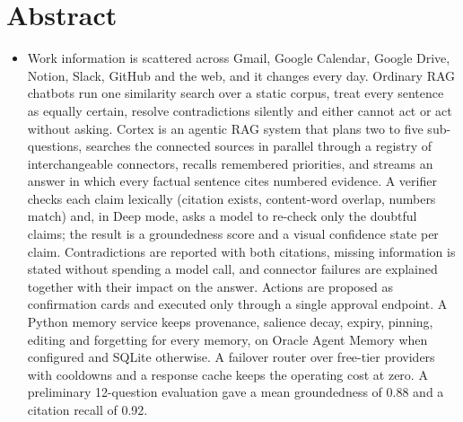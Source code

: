 \documentclass[oneside,a4paper,12pt]{report}
\begin{document}
\section{Abstract}
\begin{itemize}
	\item Work information is scattered across Gmail, Google Calendar, Google Drive, Notion, Slack, GitHub and the web, and it changes every day. Ordinary RAG chatbots run one similarity search over a static corpus, treat every sentence as equally certain, resolve contradictions silently and either cannot act or act without asking. Cortex is an agentic RAG system that plans two to five sub-questions, searches the connected sources in parallel through a registry of interchangeable connectors, recalls remembered priorities, and streams an answer in which every factual sentence cites numbered evidence. A verifier checks each claim lexically (citation exists, content-word overlap, numbers match) and, in Deep mode, asks a model to re-check only the doubtful claims; the result is a groundedness score and a visual confidence state per claim. Contradictions are reported with both citations, missing information is stated without spending a model call, and connector failures are explained together with their impact on the answer. Actions are proposed as confirmation cards and executed only through a single approval endpoint. A Python memory service keeps provenance, salience decay, expiry, pinning, editing and forgetting for every memory, on Oracle Agent Memory when configured and SQLite otherwise. A failover router over free-tier providers with cooldowns and a response cache keeps the operating cost at zero. A preliminary 12-question evaluation gave a mean groundedness of 0.88 and a citation recall of 0.92.
\end{itemize}
\end{document}
